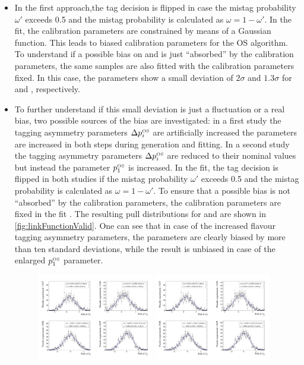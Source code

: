 \begin{itemize}
	\item In the first approach,the tag decision is flipped in case the mistag probability $\omega'$ exceeds \num{0.5} and the mistag probability is calculated as $\omega=1-\omega'$.
	In the fit, the calibration parameters are constrained by means of a Gaussian function. This leads to biased calibration parameters for the OS algorithm.
	To understand if a possible bias on \Sf and \Sfbar is just \enquote{absorbed} by the calibration parameters, the same samples are also fitted with the calibration parameters fixed.
	In this case, the \CP parameters show a small deviation of $2\sigma$ and $1.3\sigma$ for \Sf and \Sfbar, respectively.
	\item To further understand if this small deviation is just a fluctuation or a real bias, two possible sources of the bias are investigated:
	in a first study the tagging asymmetry parameters $\Delta p_i^{\text{\tiny OS}}$ are artificially increased \ie the parameters are increased in both steps during generation and fitting.
    In a second study the tagging asymmetry parameters $\Delta p_i^{\text{\tiny OS}}$ are reduced to their nominal values but instead the parameter $p_1^{\text{\tiny OS}}$ is increased.
	In the fit, the tag decision is flipped in both studies if the mistag probability $\omega'$ exceeds \num{0.5} and the mistag probability is calculated as $\omega=1-\omega'$.
	To ensure that a possible bias is not \enquote{absorbed} by the calibration parameters, the calibration parameters are fixed in the fit .
	The resulting pull distributions for \Sf and \Sfbar are shown in \cref{fig:linkFunctionValid}.
	One can see that in case of the increased flavour tagging asymmetry parameters, the \CP parameters are clearly biased by more than ten standard deviations, while the result is unbiased in case of the enlarged $p_1^{\text{\tiny OS}}$ parameter.
	\begin{figure}[tbp]
    \centering
    	\includegraphics[width=0.48\textwidth]{10TimeFit/figs/Sf_pull_LinkValid_asym.pdf}
    	\includegraphics[width=0.48\textwidth]{10TimeFit/figs/Sfbar_pull_LinkValid_asym.pdf}\\

\end{figure}
\end{itemize}
